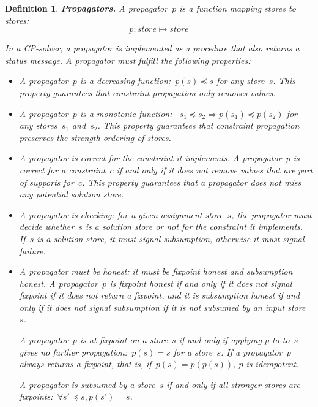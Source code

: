 \documentclass[a4paper,11pt]{article}
\newtheorem{definition}{Definition}
\numberwithin{equation}{section}
\begin{document}
\begin{definition} \label{def:prop}
  \textbf{Propagators.} A \emph{propagator}~$p$ is a function mapping stores to stores:
  \begin{equation*}
    p: store \mapsto store
  \end{equation*}

  In a CP-solver, a propagator is implemented as a procedure that also returns 
  a \emph{status message}. A propagator must fulfill the following properties:

  \begin{itemize}
  \item A propagator~$p$ is a decreasing function:~$p(s) \preceq s$ for any store~$s$.
    This property guarantees that constraint propagation only removes values.

  \item A propagator~$p$ is a monotonic function:
    ~$s_1 \preceq s_2 \Rightarrow p(s_1) \preceq p(s_2)$
    for any stores~$s_1$ and~$s_2$. This property guarantees that constraint propagation
    preserves the strength-ordering of stores.

  \item A propagator is correct for the constraint it implements.
    A propagator~$p$
    is correct for a constraint~$c$ if and only if it does not
    remove values that are part of supports for~$c$.
    This property guarantees that a propagator does not miss any potential 
    solution store.

  \item A propagator is \emph{checking}: for a given assignment store~$s$, the propagator
    must decide whether~$s$ is a solution store or not for the constraint it
    implements. If~$s$ is a solution store, it must signal subsumption, otherwise
    it must signal failure.

  \item A propagator must be \emph{honest}: it must be 
    \emph{fixpoint honest} and \emph{subsumption honest}. 
    A propagator~$p$ is fixpoint honest if and only if it does not signal 
    fixpoint if it does not return a fixpoint, and it is subsumption honest
    if and only if it does
    not signal subsumption if it is not subsumed by an input store~$s$.
    
    A propagator~$p$ is at \emph{fixpoint} on a store~$s$ if and only if applying 
    $p$ to to~$s$ gives no further propagation:~$p(s) = s$ for
    a store~$s$. If a propagator~$p$ always returns a fixpoint, that is, 
    if~$p(s) = p(p(s))$, $p$ is \emph{idempotent}.

    A propagator is \emph{subsumed} by a store~$s$ if and only if
    all stronger stores are fixpoints:~$\forall s'\preceq s,p(s')=s$.

\end{itemize}

\end{definition}
\end{document}
